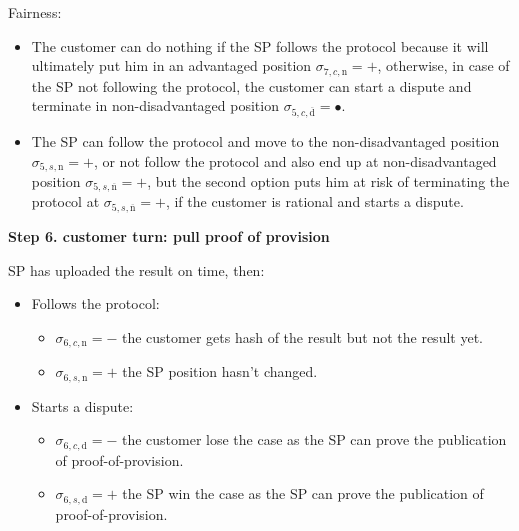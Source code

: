 \documentclass{ieeeaccess}
\begin{document}
Fairness:

\begin{itemize}

\item
  The customer can do nothing if the SP follows the protocol because it
  will ultimately put him in an advantaged position
  \(\sigma_{7, c, \mathrm{n}} = +\), otherwise, in case of the SP not
  following the protocol, the customer can start a dispute and terminate
  in non-disadvantaged position
  \(\sigma_{5, c, \overline{\mathrm{d}}} = •\).
\item
  The SP can follow the protocol and move to the non-disadvantaged
  position \(\sigma_{5, s, \mathrm{n}} = +\), or not follow the protocol
  and also end up at non-disadvantaged position
  \(\sigma_{5, s, \overline{\mathrm{n}}} = +\), but the second option
  puts him at risk of terminating the protocol at
  \(\sigma_{5, s, \overline{\mathrm{n}}} = +\), if the customer is
  rational and starts a dispute.
\end{itemize}


\noindent \textbf
{Step 6. customer turn: pull proof of provision}\label{step-6-pull-proof-of-provision}

SP has uploaded the result on time, then:

\begin{itemize}
\item
  Follows the protocol:

  \begin{itemize}
  
  \item
    \(\sigma_{6, c, \mathrm{n}} = -\) the customer gets hash of the
    result but not the result yet.
  \item
    \(\sigma_{6, s, \mathrm{n}} = +\) the SP position hasn't changed.
  \end{itemize}
\item
  Starts a dispute:

  \begin{itemize}
  
  \item
    \(\sigma_{6, c, \mathrm{d}} = -\) the customer lose the case as the
    SP can prove the publication of proof-of-provision.
  \item
    \(\sigma_{6, s, \mathrm{d}} = +\) the SP win the case as the SP can
    prove the publication of proof-of-provision.
  \end{itemize}
\end{itemize}
\end{document}
